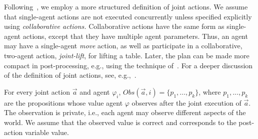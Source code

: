 \documentclass[letterpaper]{article} %
\theoremstyle{definition}
\begin{document}
Following~\citet{IMAP}, we employ a more structured definition of joint actions. 
We assume that single-agent actions are not executed concurrently unless specified explicitly using
{\em collaborative actions.} Collaborative actions have the same form as single-agent actions, except that they have multiple agent parameters.
Thus, an agent may have a single-agent {\em move} action, as well as participate in a
collaborative, two-agent action, {\em joint-lift}, for lifting a table. 
Later, the plan can be made more
compact in post-processing, e.g., using the technique of~\citet{CJR14}. For a deeper discussion of the definition of joint actions, see, e.g.,~\citep{ShekharB18,ShekharB20}.

For every joint action $\vec{a}$ and agent $\varphi_i$, $\mathit{Obs}(\vec{a},i)=\{p_1,\ldots,p_k\}$, where $p_1,...,p_k$ are the propositions whose value agent $\varphi$ observes after the joint execution of $\vec{a}$. The observation is private, i.e., each agent may observe different aspects of the world. We assume that the observed value is correct and corresponds to the post-action variable value. 
\end{document}
